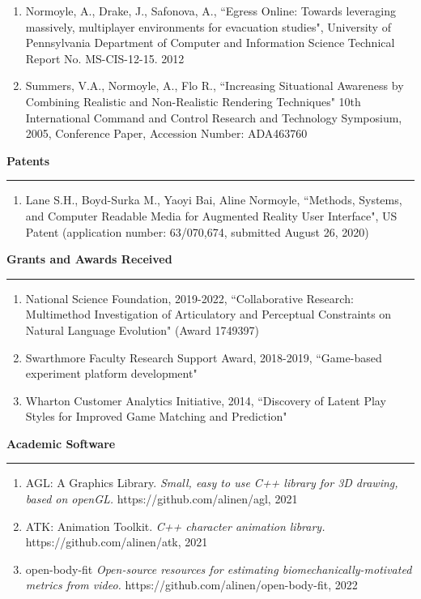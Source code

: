 \begin{enumerate}[leftmargin=*]
\item Normoyle, A., Drake, J., Safonova, A., ``Egress Online: Towards leveraging massively, multiplayer environments for evacuation studies", University of Pennsylvania Department of Computer and Information Science Technical Report No. MS-CIS-12-15. 2012

\item Summers, V.A., Normoyle, A., Flo R., ``Increasing Situational Awareness by Combining Realistic and Non-Realistic Rendering Techniques" 10th International Command and Control Research and Technology Symposium, 2005, Conference Paper,  Accession Number: ADA463760 
\end{enumerate}

\medskip
\medskip

{\Large {\bf Patents}}
\vspace{0.1cm}
\hrule
\medskip

\begin{enumerate}[leftmargin=*]
\item Lane S.H., Boyd-Surka M., Yaoyi Bai, Aline Normoyle, ``Methods, Systems, and Computer Readable Media for Augmented Reality User Interface", US Patent (application number: 63/070,674, submitted August 26, 2020)
\end{enumerate}

\medskip
\medskip

{\Large {\bf Grants and Awards Received}}
\vspace{0.1cm}
\hrule
\medskip

\begin{enumerate}[leftmargin=*]
\item National Science Foundation, 2019-2022, 
``Collaborative Research: Multimethod Investigation of Articulatory and Perceptual Constraints on Natural Language Evolution" (Award 1749397)

\item Swarthmore Faculty Research Support Award, 2018-2019, ``Game-based experiment platform development"

\item Wharton Customer Analytics Initiative, 2014, ``Discovery of Latent Play Styles for Improved Game Matching and Prediction"
\end{enumerate}

\medskip
\medskip

{\Large {\bf Academic Software}}
\vspace{0.1cm}
\hrule
\medskip

\begin{enumerate}[leftmargin=*]
\item AGL: A Graphics Library. \textit{Small, easy to use C++ library for 3D drawing, based on openGL.} https://github.com/alinen/agl, 2021
\item ATK: Animation Toolkit. \textit{C++ character animation library.} https://github.com/alinen/atk, 2021
\item open-body-fit \textit{Open-source resources for estimating biomechanically-motivated metrics from video.} https://github.com/alinen/open-body-fit, 2022
\end{enumerate}